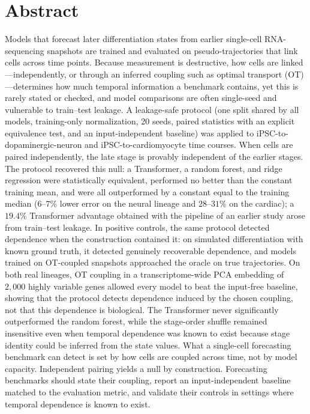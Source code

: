 \documentclass[10pt,letterpaper]{article}
\begin{document}
\section*{Abstract}
Models that forecast later differentiation states from earlier single-cell RNA-sequencing snapshots are trained and evaluated on pseudo-trajectories that link cells across time points. Because measurement is destructive, how cells are linked---independently, or through an inferred coupling such as optimal transport (OT)---determines how much temporal information a benchmark contains, yet this is rarely stated or checked, and model comparisons are often single-seed and vulnerable to train--test leakage. A leakage-safe protocol (one split shared by all models, training-only normalization, 20 seeds, paired statistics with an explicit equivalence test, and an input-independent baseline) was applied to iPSC-to-dopaminergic-neuron and iPSC-to-cardiomyocyte time courses. When cells are paired independently, the late stage is provably independent of the earlier stages. The protocol recovered this null: a Transformer, a random forest, and ridge regression were statistically equivalent, performed no better than the constant training mean, and were all outperformed by a constant equal to the training median ($6$--$7\%$ lower error on the neural lineage and $28$--$31\%$ on the cardiac); a $19.4\%$ Transformer advantage obtained with the pipeline of an earlier study arose from train--test leakage. In positive controls, the same protocol detected dependence when the construction contained it: on simulated differentiation with known ground truth, it detected genuinely recoverable dependence, and models trained on OT-coupled snapshots approached the oracle on true trajectories. On both real lineages, OT coupling in a transcriptome-wide PCA embedding of $2{,}000$ highly variable genes allowed every model to beat the input-free baseline, showing that the protocol detects dependence induced by the chosen coupling, not that this dependence is biological. The Transformer never significantly outperformed the random forest, while the stage-order shuffle remained insensitive even when temporal dependence was known to exist because stage identity could be inferred from the state values. What a single-cell forecasting benchmark can detect is set by how cells are coupled across time, not by model capacity. Independent pairing yields a null by construction. Forecasting benchmarks should state their coupling, report an input-independent baseline matched to the evaluation metric, and validate their controls in settings where temporal dependence is known to exist.
\end{document}
